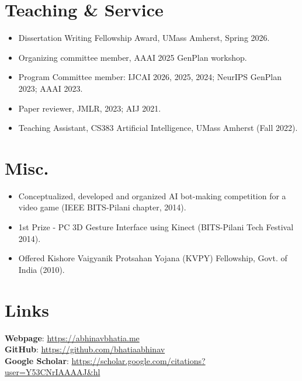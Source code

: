 \documentclass[letterpaper,11pt]{article}
\begin{document}
\section*{Teaching \& Service}
\begin{itemize}
    \setlength\itemsep{0em}
  \item Dissertation Writing Fellowship Award, UMass Amherst, Spring 2026.
  \item Organizing committee member, AAAI 2025 GenPlan workshop.
  \item Program Committee member: IJCAI 2026, 2025, 2024; NeurIPS GenPlan 2023; AAAI 2023.
  \item Paper reviewer, JMLR, 2023; AIJ 2021.
  \item Teaching Assistant, CS383 Artificial Intelligence, UMass Amherst (Fall 2022).
\end{itemize}

\section*{Misc.}
\begin{itemize}
    \setlength\itemsep{0em}
  \item Conceptualized, developed and organized AI bot-making competition for a video game (IEEE BITS-Pilani chapter, 2014).
  \item 1st Prize - PC 3D Gesture Interface using Kinect (BITS-Pilani Tech Festival 2014).
  \item Offered Kishore Vaigyanik Protsahan Yojana (KVPY) Fellowship, Govt. of India (2010).
\end{itemize}
\section*{Links}
\textbf{Webpage}: \href{https://abhinavbhatia.me}{https://abhinavbhatia.me}\\
\textbf{GitHub}: \href{https://github.com/bhatiaabhinav}{https://github.com/bhatiaabhinav}\\
\textbf{Google Scholar}: \href{https://scholar.google.com/citations?user=Y53CNrIAAAAJ\&hl}{https://scholar.google.com/citations?user=Y53CNrIAAAAJ\&hl}
\end{document}
